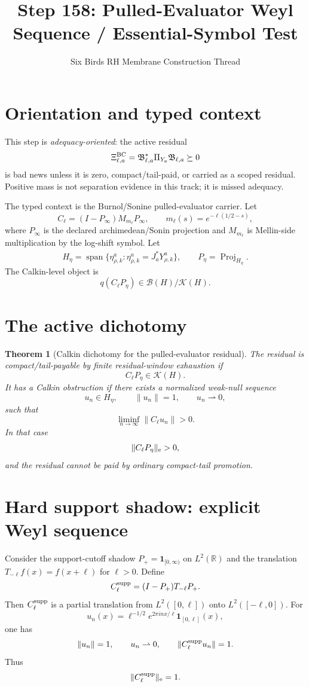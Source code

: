 \documentclass[11pt]{article}
\title{Step 158: Pulled-Evaluator Weyl Sequence / Essential-Symbol Test}
\author{Six Birds RH Membrane Construction Thread}
\date{}
\newtheorem{theorem}{Theorem}
\begin{document}
\maketitle

\section{Orientation and typed context}
This step is \emph{adequacy-oriented}: the active residual
\[
  \Xi^{\rm BC}_{\ell,a}=\mathfrak B_{\ell,a}^*\Pi_{Y_a}\mathfrak B_{\ell,a}\succeq 0
\]
is bad news unless it is zero, compact/tail-paid, or carried as a scoped residual.  Positive
mass is not separation evidence in this track; it is missed adequacy.

The typed context is the Burnol/Sonine pulled-evaluator carrier.  Let
\[
  C_\ell=(I-P_\infty)M_{m_\ell}P_\infty,
  \qquad m_\ell(s)=e^{-\ell(1/2-s)},
\]
where $P_\infty$ is the declared archimedean/Sonin projection and $M_{m_\ell}$ is Mellin-side
multiplication by the log-shift symbol.  Let
\[
  H_\eta=\overline{\operatorname{span}\{\eta^a_{\rho,k}:\eta^a_{\rho,k}=J_a^*Y^a_{\rho,k}\}},
  \qquad P_\eta=\operatorname{Proj}_{H_\eta}.
\]
The Calkin-level object is
\[
  q(C_\ell P_\eta)\in\mathcal B(H)/\mathcal K(H).
\]

\section{The active dichotomy}
\begin{theorem}[Calkin dichotomy for the pulled-evaluator residual]
The residual is compact/tail-payable by finite residual-window exhaustion if
\[
  C_\ell P_\eta\in\mathcal K(H).
\]
It has a Calkin obstruction if there exists a normalized weak-null sequence
\[
  u_n\in H_\eta,
  \qquad \|u_n\|=1,
  \qquad u_n\rightharpoonup0,
\]
such that
\[
  \liminf_{n\to\infty}\|C_\ell u_n\|>0.
\]
In that case
\[
  \|C_\ell P_\eta\|_{\rm e}>0,
\]
and the residual cannot be paid by ordinary compact-tail promotion.
\end{theorem}

\section{Hard support shadow: explicit Weyl sequence}
Consider the support-cutoff shadow $P_+=\mathbf 1_{[0,\infty)}$ on $L^2(\mathbb R)$ and the translation
$T_{-\ell}f(x)=f(x+\ell)$ for $\ell>0$.  Define
\[
  C_\ell^{\rm supp}=(I-P_+)T_{-\ell}P_+.
\]
Then $C_\ell^{\rm supp}$ is a partial translation from $L^2([0,\ell])$ onto $L^2([-\ell,0])$.
For
\[
  u_n(x)=\ell^{-1/2}e^{2\pi i n x/\ell}\mathbf 1_{[0,\ell]}(x),
\]
one has
\[
  \|u_n\|=1,
  \qquad u_n\rightharpoonup0,
  \qquad \|C_\ell^{\rm supp}u_n\|=1.
\]
Thus
\[
  \|C_\ell^{\rm supp}\|_{\rm e}=1.
\]
\end{document}
